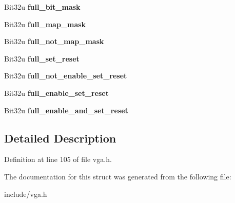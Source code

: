 \begin{DoxyCompactItemize}
\item 
\hypertarget{structVGA__Config_aeafb31cb767815375d30a6f0ba48e319}{Bit32u {\bfseries full\-\_\-bit\-\_\-mask}}\label{structVGA__Config_aeafb31cb767815375d30a6f0ba48e319}

\item 
\hypertarget{structVGA__Config_a4b6aad5a5153cac8c62619fec4fe15b4}{Bit32u {\bfseries full\-\_\-map\-\_\-mask}}\label{structVGA__Config_a4b6aad5a5153cac8c62619fec4fe15b4}

\item 
\hypertarget{structVGA__Config_a9621b79f2d85534101795b9a38e6c165}{Bit32u {\bfseries full\-\_\-not\-\_\-map\-\_\-mask}}\label{structVGA__Config_a9621b79f2d85534101795b9a38e6c165}

\item 
\hypertarget{structVGA__Config_ac7477048acf903ad2b40036fd7e17f8e}{Bit32u {\bfseries full\-\_\-set\-\_\-reset}}\label{structVGA__Config_ac7477048acf903ad2b40036fd7e17f8e}

\item 
\hypertarget{structVGA__Config_a7317f0353f9262ed950c47779ead4a45}{Bit32u {\bfseries full\-\_\-not\-\_\-enable\-\_\-set\-\_\-reset}}\label{structVGA__Config_a7317f0353f9262ed950c47779ead4a45}

\item 
\hypertarget{structVGA__Config_a045f0b43adea277828837e3cc956000e}{Bit32u {\bfseries full\-\_\-enable\-\_\-set\-\_\-reset}}\label{structVGA__Config_a045f0b43adea277828837e3cc956000e}

\item 
\hypertarget{structVGA__Config_ac1a974050a7c80f93935ad23fc5ba1f5}{Bit32u {\bfseries full\-\_\-enable\-\_\-and\-\_\-set\-\_\-reset}}\label{structVGA__Config_ac1a974050a7c80f93935ad23fc5ba1f5}

\end{DoxyCompactItemize}


\subsection{Detailed Description}


Definition at line 105 of file vga.\-h.



The documentation for this struct was generated from the following file\-:\begin{DoxyCompactItemize}
\item 
include/vga.\-h\end{DoxyCompactItemize}
